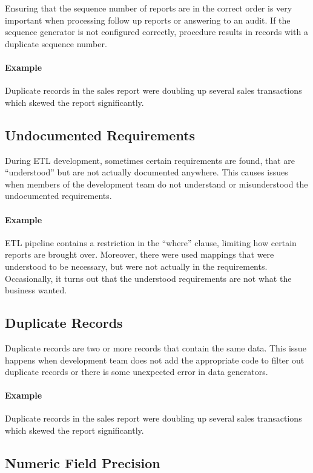 Ensuring that the sequence number of reports are in the correct order is very important when processing follow up reports or answering to an audit.
If the sequence generator is not configured correctly, procedure results in records with a duplicate sequence number.

\paragraph*{Example} Duplicate records in the sales report were doubling up several sales transactions which skewed the report significantly.

\subsection*{Undocumented Requirements}

During ETL development, sometimes certain requirements are found, that are \enquote{understood} but are not actually documented anywhere.
This causes issues when members of the development team do not understand or misunderstood the undocumented requirements.

\paragraph*{Example} ETL pipeline contains a restriction in the \enquote{where} clause, limiting how certain reports are brought over.
Moreover, there were used mappings that were understood to be necessary, but were not actually in the requirements.
Occasionally, it turns out that the understood requirements are not what the business wanted.

\subsection*{Duplicate Records}

Duplicate records are two or more records that contain the same data.
This issue happens when development team does not add the appropriate code to filter out duplicate records or there is some unexpected error in data generators.

\paragraph*{Example} Duplicate records in the sales report were doubling up several sales transactions which skewed the report significantly.

\subsection*{Numeric Field Precision}

